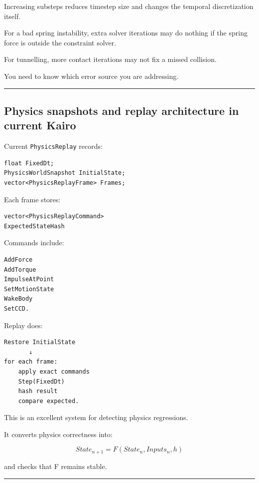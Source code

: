 Increasing substeps reduces timestep size and changes the temporal discretization itself.

For a bad spring instability, extra solver iterations may do nothing if the spring force is outside the constraint solver.

For tunnelling, more contact iterations may not fix a missed collision.

You need to know which error source you are addressing.

\begin{center}\rule{0.5\linewidth}{0.5pt}\end{center}

\subsection{Physics snapshots and replay architecture in current Kairo}\label{06-engine-ii-ch038-physics-snapshots-and-replay-architecture-in-current-kairo}

Current \texttt{PhysicsReplay} records:

\begin{verbatim}
float FixedDt;
PhysicsWorldSnapshot InitialState;
vector<PhysicsReplayFrame> Frames;
\end{verbatim}

Each frame stores:

\begin{verbatim}
vector<PhysicsReplayCommand>
ExpectedStateHash
\end{verbatim}

Commands include:

\begin{verbatim}
AddForce
AddTorque
ImpulseAtPoint
SetMotionState
WakeBody
SetCCD.
\end{verbatim}

Replay does:

\begin{verbatim}
Restore InitialState
       ↓
for each frame:
    apply exact commands
    Step(FixedDt)
    hash result
    compare expected.
\end{verbatim}

This is an excellent system for detecting physics regressions.

It converts physics correctness into:

\[
\boxed{
State_{n+1}
=
F(State_n,Inputs_n,h)
}
\]

and checks that F remains stable.

\begin{center}\rule{0.5\linewidth}{0.5pt}\end{center}

